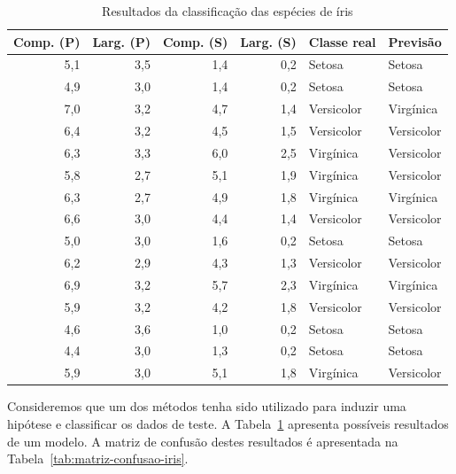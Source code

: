 \begin{table}[h]
	\centering
	
	\begin{tabular}{rrrrll}
		\hline
		\textbf{Comp. (P)} & \textbf{Larg. (P)} & \textbf{Comp. (S)} & \textbf{Larg. (S)} & \textbf{Classe real} & \textbf{Previsão} \\
		\hline
		5,1 & 3,5 & 1,4 & 0,2 & Setosa & Setosa \\
		4,9 & 3,0 & 1,4 & 0,2 & Setosa & Setosa \\
		7,0 & 3,2 & 4,7 & 1,4 & Versicolor & Virgínica \\
		6,4 & 3,2 & 4,5 & 1,5 & Versicolor & Versicolor \\
		6,3 & 3,3 & 6,0 & 2,5 & Virgínica & Versicolor \\
		5,8 & 2,7 & 5,1 & 1,9 & Virgínica & Versicolor \\
		6,3 & 2,7 & 4,9 & 1,8 & Virgínica & Virgínica \\
		6,6 & 3,0 & 4,4 & 1,4 & Versicolor & Versicolor \\
		5,0 & 3,0 & 1,6 & 0,2 & Setosa & Setosa \\
		6,2 & 2,9 & 4,3 & 1,3 & Versicolor & Versicolor \\
		6,9 & 3,2 & 5,7 & 2,3 & Virgínica & Virgínica \\
		5,9 & 3,2 & 4,2 & 1,8 & Versicolor & Versicolor \\
		4,6 & 3,6 & 1,0 & 0,2 & Setosa & Setosa \\
		4,4 & 3,0 & 1,3 & 0,2 & Setosa & Setosa \\
		5,9 & 3,0 & 5,1 & 1,8 & Virgínica & Versicolor \\
		\hline
	\end{tabular}
	
	\caption{Resultados da classificação das espécies de íris}
	\label{tab:dados-testados-iris}
\end{table}

Consideremos que um dos métodos tenha sido utilizado para induzir uma hipótese e classificar os dados de teste. A Tabela~\ref{tab:dados-testados-iris} apresenta possíveis resultados de um modelo. A matriz de confusão destes resultados é apresentada na Tabela~\ref{tab:matriz-confusao-iris}.

